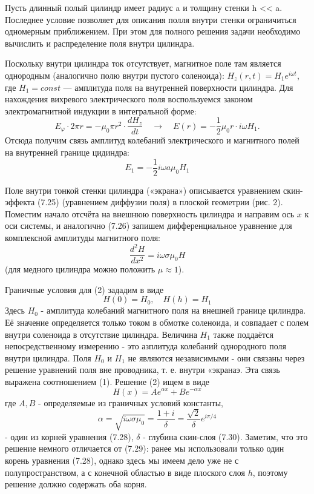 \documentclass[a4paper, 12pt]{article}
\begin{document}
Пусть длинный полый цилиндр имеет радиус a и толщину стенки h << a. Последнее условие позволяет для описания полля внутри стенки ограничиться одномерным приближением. При этом 
для полного решения задачи необходимо вычислить и распределение поля внутри цилиндра.

Поскольку внутри цилиндра ток отсутствует, магнитное поле там является однородным (аналогично полю внутри пустого соленоида): $H_z(r, t) = H_1 e^{i\omega t}$, где $H_1 = const$
--- амплитуда поля на внутренней поверхности цилиндра. Для нахождения вихревого электрического поля воспользуемся законом электромагнитной индукции в интегральной форме:
$$
E_{\varphi} \cdot 2 \pi r=-\mu_0 \pi r^2 \cdot \frac{d H_z}{d t} \quad \rightarrow \quad E(r)=-\frac{1}{2} \mu_0 r \cdot i \omega H_1 .
$$
Отсюда получим связь амплитуд колебаний электрического и магнитного полей на внутренней границе цидиндра:
\begin{equation}
	E_1 = -\frac{1}{2}i\omega a \mu_0 H_1
\end{equation}

Поле внутри тонкой стенки цилиндра («экрана») описывается уравнением скин-эффекта (7.25) (уравнением диффузии поля) в плоской геометрии (рис. 2). Поместим начало отсчёта на внешнюю поверхность цилиндра и направим ось $x$ к оси системы, и аналогично (7.26) запишем дифференциальное уравнение для комплексной амплитуды магнитного поля: 
\begin{equation} 
	\frac{d^2 H}{d x^2}=i \omega \sigma \mu_0 H
\end{equation}
(для медного цилиндра можно положить $\mu \approx 1$). 

Граничные условия для (2) зададим в виде
\begin{equation}
H(0)=H_0, \quad H(h)=H_1
\end{equation}
Здесь $H_0$ - амплитуда колебаний магнитного поля на внешней границе цилиндра. Её значение определяется только током в обмотке соленоида, и совпадает с полем внутри соленоида в отсутствие цилиндра. Величина $H_1$ также поддаётся непосредственному измерению - это азплитуда колебаний однородного поля внутри цилиндра. Поля $H_0$ и $H_1$ не являются независимыми - они связаны через решение уравнений поля вне проводника, т. е. внутри «экранаэ. Эта связь выражена соотношением (1). Решение (2) ищем в виде
\begin{equation}
H(x)=A e^{\alpha x}+B e^{-\alpha x}
\end{equation}
где $A, B$ - определяемые из граничных условий константы,
\begin{equation}
\alpha=\sqrt{i \omega \sigma \mu_0}=\frac{1+i}{\delta}=\frac{\sqrt{2}}{\delta} e^{i \pi / 4}
\end{equation}
- один из корней уравнения (7.28), $\delta$ - глубина скин-слоя (7.30). Заметим, что это решение немного отличается от (7.29): ранее мы использовали только один корень уравнения (7.28), однако здесь мы имеем дело уже не с полупространством, а с конечной областью в виде плоского слоя $h$, поэтому решение должно содержать оба корня.
\end{document}
